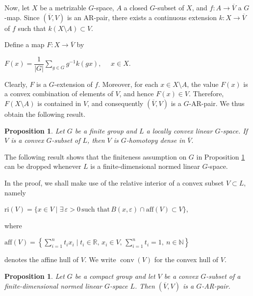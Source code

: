 \documentclass[12pt]{amsart}
\newtheorem{proposition}[theorem]{Proposition}
\theoremstyle{definition}
\begin{document}
	Now, let $X$ be a metrizable $G$-space, $A$ a closed $G$-subset of $X$, and $f: A\rightarrow \overline{V}$  a $G$-map. Since $(\overline{V},V)$ is an AR-pair, there exists a continuous extension $k: X\rightarrow \overline{V}$ of $f$ such that $k(X\setminus A)\subset V$. 
	
	Define a map $F: X\rightarrow \overline{V}$ by 
	
	\begin{center}
		$F(x)=\dfrac{1}{|G|}\displaystyle\sum\limits_{g\in G}g^{-1}k(gx),\quad$ $x\in X$.
	\end{center}
	
	Clearly, $F$ is a $G$-extension of $f$. Moreover, for each $x\in X\setminus A$, the value $F(x)$ is a convex combination of elements of $V$, and hence $F(x)\in V$. Therefore, $F(X\setminus A)$ is contained in $V$, and consequently $(\overline{V},V)$ is a $G$-AR-pair. We thus obtain the following result.
	
	\begin{proposition}\label{ConvexARpairfi}
		\rm{Let $G$ be a finite group and $L$ a locally convex linear $G$-space. If $V$ is a convex $G$-subset of $L$, then $V$ is $G$-homotopy dense in $\overline{V}.$}
	\end{proposition}
	
The following result shows that the finiteness assumption on $G$ in Proposition \ref{ConvexARpairfi} can be dropped whenever $L$ is a finite-dimensional normed linear $G$-space.

In the proof, we shall make use of the relative interior of a convex subset $V \subset L$, namely
	
	\begin{center}
		$\text{ri}(V)=\{x\in V\mid \exists\, \varepsilon>0\, \text{such that}\, B(x,\varepsilon)\cap \text{aff}(V)\subset V\}$,
	\end{center}
	where 
	
	\begin{center}
		$\text{aff}(V)=\left\{\displaystyle\sum_{i=1}^nt_ix_i\mid t_i\in\mathbb{R},\, x_i\in V,\, \sum_{i=1}^nt_i=1, \  n\in\mathbb{N}\right\}$
	\end{center}
	denotes the affine hull of $V$. We write $\operatorname{conv}(V)$ for the convex hull of $V$.
	
	\begin{proposition}
		\rm{Let $G$ be a compact group and let $V$ be a convex $G$-subset of a finite-dimensional normed linear $G$-space $L$. Then $(\overline{V},V)$ is a $G$-AR-pair.}
	\end{proposition}
	
\end{document}

